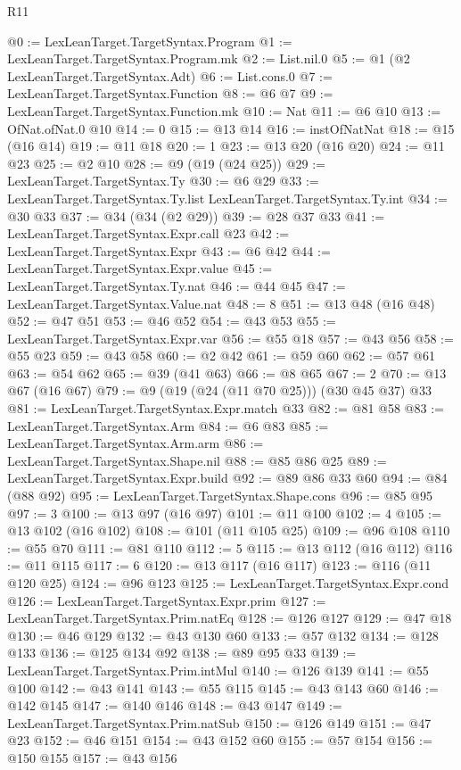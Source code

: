 \begin{lexlean}{R11}
\begin{coremodule}
@0 := LexLeanTarget.TargetSyntax.Program
@1 := LexLeanTarget.TargetSyntax.Program.mk
@2 := List.nil.{0}
@5 := @1 (@2 LexLeanTarget.TargetSyntax.Adt)
@6 := List.cons.{0}
@7 := LexLeanTarget.TargetSyntax.Function
@8 := @6 @7
@9 := LexLeanTarget.TargetSyntax.Function.mk
@10 := Nat
@11 := @6 @10
@13 := OfNat.ofNat.{0} @10
@14 := 0
@15 := @13 @14
@16 := instOfNatNat
@18 := @15 (@16 @14)
@19 := @11 @18
@20 := 1
@23 := @13 @20 (@16 @20)
@24 := @11 @23
@25 := @2 @10
@28 := @9 (@19 (@24 @25))
@29 := LexLeanTarget.TargetSyntax.Ty
@30 := @6 @29
@33 := LexLeanTarget.TargetSyntax.Ty.list LexLeanTarget.TargetSyntax.Ty.int
@34 := @30 @33
@37 := @34 (@34 (@2 @29))
@39 := @28 @37 @33
@41 := LexLeanTarget.TargetSyntax.Expr.call @23
@42 := LexLeanTarget.TargetSyntax.Expr
@43 := @6 @42
@44 := LexLeanTarget.TargetSyntax.Expr.value
@45 := LexLeanTarget.TargetSyntax.Ty.nat
@46 := @44 @45
@47 := LexLeanTarget.TargetSyntax.Value.nat
@48 := 8
@51 := @13 @48 (@16 @48)
@52 := @47 @51
@53 := @46 @52
@54 := @43 @53
@55 := LexLeanTarget.TargetSyntax.Expr.var
@56 := @55 @18
@57 := @43 @56
@58 := @55 @23
@59 := @43 @58
@60 := @2 @42
@61 := @59 @60
@62 := @57 @61
@63 := @54 @62
@65 := @39 (@41 @63)
@66 := @8 @65
@67 := 2
@70 := @13 @67 (@16 @67)
@79 := @9 (@19 (@24 (@11 @70 @25))) (@30 @45 @37) @33
@81 := LexLeanTarget.TargetSyntax.Expr.match @33
@82 := @81 @58
@83 := LexLeanTarget.TargetSyntax.Arm
@84 := @6 @83
@85 := LexLeanTarget.TargetSyntax.Arm.arm
@86 := LexLeanTarget.TargetSyntax.Shape.nil
@88 := @85 @86 @25
@89 := LexLeanTarget.TargetSyntax.Expr.build
@92 := @89 @86 @33 @60
@94 := @84 (@88 @92)
@95 := LexLeanTarget.TargetSyntax.Shape.cons
@96 := @85 @95
@97 := 3
@100 := @13 @97 (@16 @97)
@101 := @11 @100
@102 := 4
@105 := @13 @102 (@16 @102)
@108 := @101 (@11 @105 @25)
@109 := @96 @108
@110 := @55 @70
@111 := @81 @110
@112 := 5
@115 := @13 @112 (@16 @112)
@116 := @11 @115
@117 := 6
@120 := @13 @117 (@16 @117)
@123 := @116 (@11 @120 @25)
@124 := @96 @123
@125 := LexLeanTarget.TargetSyntax.Expr.cond
@126 := LexLeanTarget.TargetSyntax.Expr.prim
@127 := LexLeanTarget.TargetSyntax.Prim.natEq
@128 := @126 @127
@129 := @47 @18
@130 := @46 @129
@132 := @43 @130 @60
@133 := @57 @132
@134 := @128 @133
@136 := @125 @134 @92
@138 := @89 @95 @33
@139 := LexLeanTarget.TargetSyntax.Prim.intMul
@140 := @126 @139
@141 := @55 @100
@142 := @43 @141
@143 := @55 @115
@145 := @43 @143 @60
@146 := @142 @145
@147 := @140 @146
@148 := @43 @147
@149 := LexLeanTarget.TargetSyntax.Prim.natSub
@150 := @126 @149
@151 := @47 @23
@152 := @46 @151
@154 := @43 @152 @60
@155 := @57 @154
@156 := @150 @155
@157 := @43 @156

\end{coremodule}
\end{lexlean}
